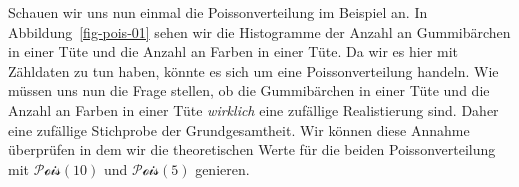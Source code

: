 \documentclass[
  letterpaper,
]{scrbook}
\begin{document}
Schauen wir uns nun einmal die Poissonverteilung im Beispiel an. In
Abbildung~\ref{fig-pois-01} sehen wir die Histogramme der Anzahl an
Gummibärchen in einer Tüte und die Anzahl an Farben in einer Tüte. Da
wir es hier mit Zähldaten zu tun haben, könnte es sich um eine
Poissonverteilung handeln. Wie müssen uns nun die Frage stellen, ob die
Gummibärchen in einer Tüte und die Anzahl an Farben in einer Tüte
\emph{wirklich} eine zufällige Realistierung sind. Daher eine zufällige
Stichprobe der Grundgesamtheit. Wir können diese Annahme überprüfen in
dem wir die theoretischen Werte für die beiden Poissonverteilung mit
\(\mathcal{Pois}(10)\) und \(\mathcal{Pois}(5)\) genieren.

\begin{figure}

\begin{minipage}[t]{0.50\linewidth}

{\centering 


}

\end{minipage}%
%
\begin{minipage}[t]{0.50\linewidth}


\end{minipage}
\end{figure}
\end{document}
